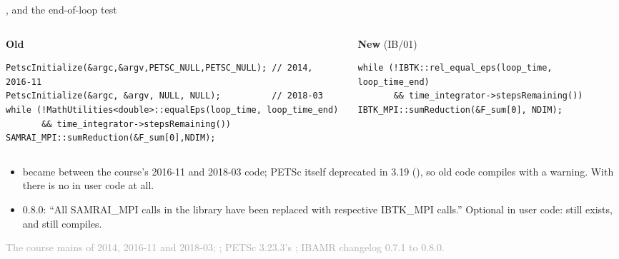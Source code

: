 \documentclass[aspectratio=169,11pt]{beamer}
\newcommand{\sourcecredit}[1]{\vfill\begin{flushright}\tiny\textcolor{DarkGray}{#1}\end{flushright}}
\begin{document}
\begin{frame}[fragile]{,  and the end-of-loop test}
\label{fr:mpi}
\begin{columns}[T,onlytextwidth]
\begin{column}{0.49\textwidth}
\textbf{Old}
\begin{lstlisting}[style=cpptiny]
PetscInitialize(&argc,&argv,PETSC_NULL,PETSC_NULL); // 2014, 2016-11
PetscInitialize(&argc, &argv, NULL, NULL);          // 2018-03
while (!MathUtilities<double>::equalEps(loop_time, loop_time_end)
       && time_integrator->stepsRemaining())
SAMRAI_MPI::sumReduction(&F_sum[0],NDIM);
\end{lstlisting}
\end{column}
\begin{column}{0.49\textwidth}
\textbf{New} (IB/01)
\begin{lstlisting}[style=cpptiny]
while (!IBTK::rel_equal_eps(loop_time, loop_time_end)
       && time_integrator->stepsRemaining())
IBTK_MPI::sumReduction(&F_sum[0], NDIM);
\end{lstlisting}
\end{column}
\end{columns}
\vspace{1mm}
\footnotesize
\begin{itemize}\setlength{\itemsep}{2pt}
  \item {} became  between the course's 2016-11 and 2018-03 code; PETSc itself deprecated  in 3.19 (), so old code compiles with a warning. With  there is no  in user code at all.
  \item {} 0.8.0: ``All SAMRAI\_MPI calls in the library have been replaced with respective IBTK\_MPI calls.'' Optional in user code:  still exists, and  still compiles.
\end{itemize}
\sourcecredit{The course mains of 2014, 2016-11 and 2018-03; \code{examples/IB/01}; PETSc 3.23.3's \code{petscsys.h}; IBAMR changelog 0.7.1 to 0.8.0.}
\end{frame}
\end{document}
